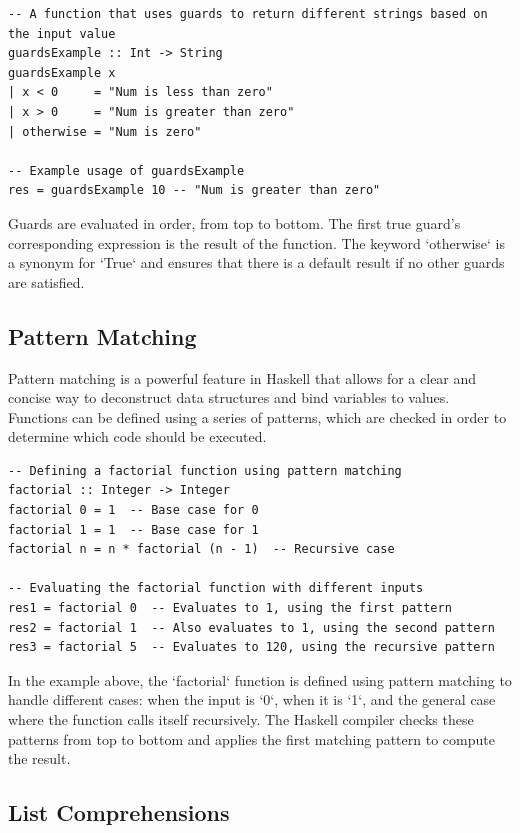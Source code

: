 \documentclass[a4paper, 10pt]{article}
\begin{document}
            \lstset{language=Haskell}
            \begin{lstlisting}
-- A function that uses guards to return different strings based on the input value
guardsExample :: Int -> String
guardsExample x
| x < 0     = "Num is less than zero"
| x > 0     = "Num is greater than zero"
| otherwise = "Num is zero"

-- Example usage of guardsExample
res = guardsExample 10 -- "Num is greater than zero"
            \end{lstlisting}

            Guards are evaluated in order, from top to bottom. The first true guard's corresponding expression is the result of the function. The keyword `otherwise` is a synonym for `True` and ensures that there is a default result if no other guards are satisfied.


        \subsection{Pattern Matching}
            Pattern matching is a powerful feature in Haskell that allows for a clear and concise way to deconstruct data structures and bind variables to values. Functions can be defined using a series of patterns, which are checked in order to determine which code should be executed.

            \lstset{language=Haskell}
            \begin{lstlisting}
-- Defining a factorial function using pattern matching
factorial :: Integer -> Integer
factorial 0 = 1  -- Base case for 0
factorial 1 = 1  -- Base case for 1
factorial n = n * factorial (n - 1)  -- Recursive case

-- Evaluating the factorial function with different inputs
res1 = factorial 0  -- Evaluates to 1, using the first pattern
res2 = factorial 1  -- Also evaluates to 1, using the second pattern
res3 = factorial 5  -- Evaluates to 120, using the recursive pattern
            \end{lstlisting}

            In the example above, the `factorial` function is defined using pattern matching to handle different cases: when the input is `0`, when it is `1`, and the general case where the function calls itself recursively. The Haskell compiler checks these patterns from top to bottom and applies the first matching pattern to compute the result.


        \subsection{List Comprehensions}
\end{document}
